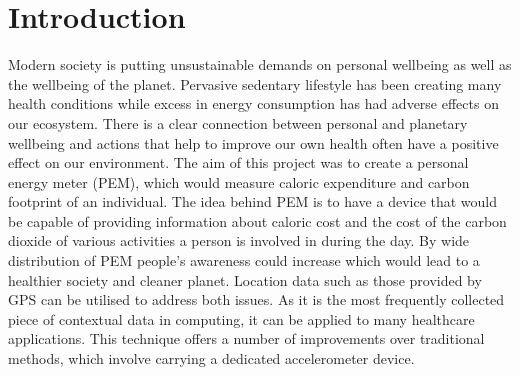 \documentclass[12pt, a4paper]{report}   %
\begin{document}
\chapter{Introduction}
Modern society is putting unsustainable demands on personal wellbeing as well as the wellbeing of the planet. Pervasive sedentary lifestyle has been creating many health conditions while excess in energy consumption has had adverse effects on our ecosystem. There is a clear connection between personal and planetary wellbeing and actions that help to improve our own health often have a positive effect on our environment. The aim of this project was to create a personal energy meter (PEM), which would measure caloric expenditure and carbon footprint of an individual. The idea behind PEM is to have a device that would be capable of providing information about caloric cost and the cost of the carbon dioxide of various activities a person is involved in during the day. By wide distribution of PEM people's awareness could increase which would lead to a healthier society and cleaner planet. Location data such as those provided by GPS can be utilised to address both issues. As it is the most frequently collected piece of contextual data in computing, it can be applied to many healthcare applications. This technique offers a number of improvements over traditional methods, which involve carrying a dedicated accelerometer device.


\end{document}
